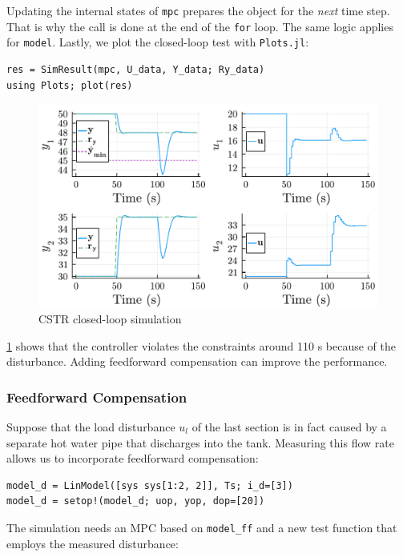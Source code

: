 Updating the internal states of \texttt{mpc} prepares the object for the \emph{next} time step. That is why the call is done at the end of the \texttt{for} loop. The same logic applies for \texttt{model}. Lastly, we plot the closed-loop test with \texttt{Plots.jl}:

\begin{verbatim}
res = SimResult(mpc, U_data, Y_data; Ry_data)
using Plots; plot(res)
\end{verbatim}

\begin{figure}
    \centering
    \includegraphics[width=\columnwidth]{fig/plot1_LinMPC.pdf}
    \caption{CSTR closed-loop simulation}
    \label{fig:plot1_LinMPC}
\end{figure}

\cref{fig:plot1_LinMPC} shows that the controller violates the constraints around 110 s because of the disturbance. Adding feedforward compensation can improve the performance.

\subsubsection{Feedforward Compensation}

Suppose that the load disturbance $u_l$ of the last section is in fact caused by a separate hot water pipe that discharges into the tank. Measuring this flow rate allows us to incorporate feedforward compensation:

\begin{verbatim}
model_d = LinModel([sys sys[1:2, 2]], Ts; i_d=[3])
model_d = setop!(model_d; uop, yop, dop=[20])
\end{verbatim}

The simulation needs an MPC based on \texttt{model\_ff} and a new test function that employs the measured disturbance:


